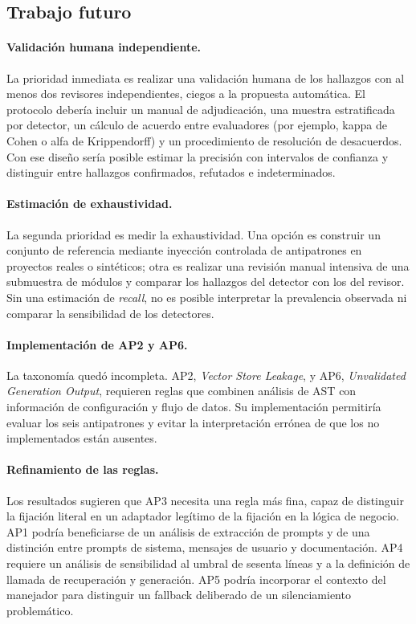 \subsection{Trabajo futuro}

\paragraph{Validación humana independiente.} La prioridad inmediata es realizar una validación humana de los hallazgos con al menos dos revisores independientes, ciegos a la propuesta automática. El protocolo debería incluir un manual de adjudicación, una muestra estratificada por detector, un cálculo de acuerdo entre evaluadores (por ejemplo, kappa de Cohen o alfa de Krippendorff) y un procedimiento de resolución de desacuerdos. Con ese diseño sería posible estimar la precisión con intervalos de confianza y distinguir entre hallazgos confirmados, refutados e indeterminados.

\paragraph{Estimación de exhaustividad.} La segunda prioridad es medir la exhaustividad. Una opción es construir un conjunto de referencia mediante inyección controlada de antipatrones en proyectos reales o sintéticos; otra es realizar una revisión manual intensiva de una submuestra de módulos y comparar los hallazgos del detector con los del revisor. Sin una estimación de \emph{recall}, no es posible interpretar la prevalencia observada ni comparar la sensibilidad de los detectores.

\paragraph{Implementación de AP2 y AP6.} La taxonomía quedó incompleta. AP2, \emph{Vector Store Leakage}, y AP6, \emph{Unvalidated Generation Output}, requieren reglas que combinen análisis de AST con información de configuración y flujo de datos. Su implementación permitiría evaluar los seis antipatrones y evitar la interpretación errónea de que los no implementados están ausentes.

\paragraph{Refinamiento de las reglas.} Los resultados sugieren que AP3 necesita una regla más fina, capaz de distinguir la fijación literal en un adaptador legítimo de la fijación en la lógica de negocio. AP1 podría beneficiarse de un análisis de extracción de prompts y de una distinción entre prompts de sistema, mensajes de usuario y documentación. AP4 requiere un análisis de sensibilidad al umbral de sesenta líneas y a la definición de llamada de recuperación y generación. AP5 podría incorporar el contexto del manejador para distinguir un fallback deliberado de un silenciamiento problemático.

